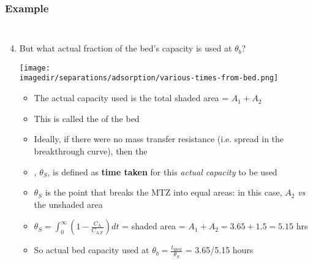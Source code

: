 \begin{frame}\frametitle{Example}
	\vspace{-12pt}
	\begin{columns}[t]
		\begin{enumerate}
			\setcounter{enumi}{3}
			\item	But what actual fraction of the bed's capacity is used at $\theta_b$?		
				\begin{center}
					\texttt{[image: \\imagedir/separations/adsorption/various-times-from-bed.png]}
				\end{center}
				\vspace{-12pt}
				\begin{itemize}
					\item	The actual capacity used is the total shaded area = $A_1 + A_2$
					\item	This is called the {\color{purple}{stoichiometric capacity}} of the bed 
					\item	Ideally, if there were no mass transfer resistance (i.e. spread in the breakthrough curve), then the
					\item	{\color{purple}{stoichiometric time}}, $\theta_S$, is defined as \textbf{time taken} for this \emph{actual capacity} to be used
					\item	$\theta_S$ is the point that breaks the MTZ into equal areas: in this case, $A_2$ \emph{vs} the unshaded area
					\vspace{2pt}
					\item	{\scriptsize $\theta_S = \displaystyle \int_0^{\infty}{\left(1-\frac{C_\text{A}}{C_\text{A,F}} \right)dt}$ = shaded area = $A_1 + A_2 = 3.65 + 1.5 = 5.15$ hrs}
					\item	So actual bed capacity used at $\theta_b = \displaystyle\frac{t_\text{used}}{\theta_S}$ = 3.65/5.15 hours {\color{myOrange}{$\sim71\%$}}  
				\end{itemize}
		\end{enumerate}
	\end{columns}	
\end{frame}

